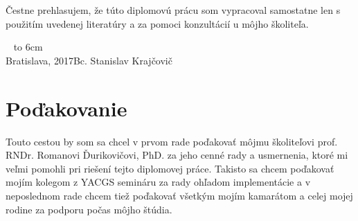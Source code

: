 \documentclass[12pt, a4paper, oneside]{book}
\newcommand\mfauthor{Bc. Stanislav Krajčovič}
\newcommand\mfplacedate{Bratislava, 2017}
\begin{document}
\begin{figure}[H]
\begin{center}
\label{img:zadanie}
\end{center}
\end{figure}

{~}\vspace{12cm}

\noindent
\begin{minipage}{0.25\textwidth}~\end{minipage}
\begin{minipage}{0.75\textwidth}
Čestne prehlasujem, že túto diplomovú prácu som vypracoval samostatne len s použitím uvedenej literatúry a za pomoci konzultácií u môjho školiteľa.
\newline \newline
\end{minipage}
\vfill
~ \hfill {\hbox to 6cm{\dotfill}} \\
\mfplacedate \hfill \mfauthor
\vfill\eject 

\chapter*{Poďakovanie}\label{chap:thank_you}
Touto cestou by som sa chcel v prvom rade poďakovať môjmu školiteľovi prof. RNDr. Romanovi Ďurikovičovi, PhD. za jeho cenné rady a usmernenia, ktoré mi veľmi pomohli pri riešení tejto diplomovej práce. Takisto sa chcem poďakovať mojím kolegom z YACGS semináru za rady ohľadom implementácie a v neposlednom rade chcem tiež poďakovať všetkým mojím kamarátom a celej mojej rodine za podporu počas môjho štúdia. 
\vfill\eject 
\end{document}
